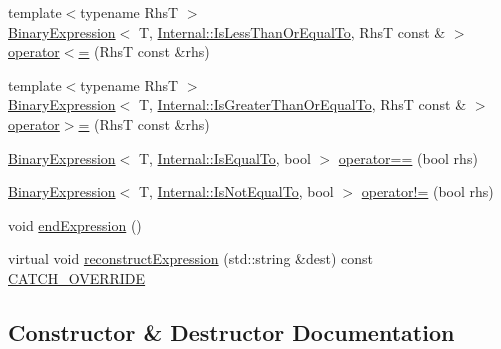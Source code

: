 \begin{DoxyCompactItemize}
\item 
{\footnotesize template$<$typename RhsT $>$ }\\\mbox{\hyperlink{class_catch_1_1_binary_expression}{Binary\+Expression}}$<$ T, \mbox{\hyperlink{namespace_catch_1_1_internal_ae3f96598a7858155750bf38e7295d83ea0db29a4c3f1e81260036c5e27a8407fd}{Internal\+::\+Is\+Less\+Than\+Or\+Equal\+To}}, RhsT const  \& $>$ \mbox{\hyperlink{class_catch_1_1_expression_lhs_a1d10974a581c67cc400cd6cdd36b0000}{operator$<$=}} (RhsT const \&rhs)
\item 
{\footnotesize template$<$typename RhsT $>$ }\\\mbox{\hyperlink{class_catch_1_1_binary_expression}{Binary\+Expression}}$<$ T, \mbox{\hyperlink{namespace_catch_1_1_internal_ae3f96598a7858155750bf38e7295d83ead2de7e9565e59e36c0987e402203ce1c}{Internal\+::\+Is\+Greater\+Than\+Or\+Equal\+To}}, RhsT const  \& $>$ \mbox{\hyperlink{class_catch_1_1_expression_lhs_a3387a494cb6b699a6c0162c79f7f533c}{operator$>$=}} (RhsT const \&rhs)
\item 
\mbox{\hyperlink{class_catch_1_1_binary_expression}{Binary\+Expression}}$<$ T, \mbox{\hyperlink{namespace_catch_1_1_internal_ae3f96598a7858155750bf38e7295d83ea30e0accba6ec8384f4383b04dd2a6a9e}{Internal\+::\+Is\+Equal\+To}}, bool $>$ \mbox{\hyperlink{class_catch_1_1_expression_lhs_ab803185079504a65b0af95f7c9669351}{operator==}} (bool rhs)
\item 
\mbox{\hyperlink{class_catch_1_1_binary_expression}{Binary\+Expression}}$<$ T, \mbox{\hyperlink{namespace_catch_1_1_internal_ae3f96598a7858155750bf38e7295d83ea1e1699cf7d3dbee0908f1a123da2456d}{Internal\+::\+Is\+Not\+Equal\+To}}, bool $>$ \mbox{\hyperlink{class_catch_1_1_expression_lhs_a1f3ff934880623f12a4cbd9725397ccf}{operator!=}} (bool rhs)
\item 
void \mbox{\hyperlink{class_catch_1_1_expression_lhs_a13d2551a927790284fb5ddf1ee2c9079}{end\+Expression}} ()
\item 
virtual void \mbox{\hyperlink{class_catch_1_1_expression_lhs_a7684a053e8e88a4be475a536252630da}{reconstruct\+Expression}} (std\+::string \&dest) const \mbox{\hyperlink{catch_8hpp_a8ecdce4d3f57835f707915ae831eb847}{C\+A\+T\+C\+H\+\_\+\+O\+V\+E\+R\+R\+I\+DE}}
\end{DoxyCompactItemize}


\subsection{Constructor \& Destructor Documentation}
\mbox{\label{class_catch_1_1_expression_lhs_aa829588def6146a94fb75de9c4cc482a}} 
